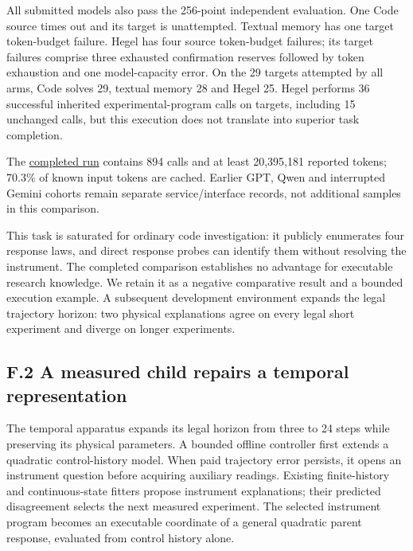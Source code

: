 \documentclass[11pt,a4paper]{article}
\begin{document}
All submitted models also pass the 256-point independent evaluation. One Code
source times out and its target is unattempted. Textual memory has one target
token-budget failure. Hegel has four source token-budget failures; its target
failures comprise three exhausted confirmation reserves followed by token
exhaustion and one model-capacity error. On the 29 targets attempted by all arms,
Code solves 29, textual memory 28 and Hegel 25. Hegel performs 36 successful
inherited experimental-program calls on targets, including 15 unchanged calls,
but this execution does not translate into superior task completion.


The \hyperlink{artifact-53}{completed run}
contains 894 calls and at least 20,395,181 reported tokens; 70.3\% of known input
tokens are cached. Earlier GPT, Qwen and interrupted Gemini cohorts remain
separate service/interface records, not additional samples in this comparison.


This task is saturated for ordinary code investigation: it publicly enumerates
four response laws, and direct response probes can identify them without
resolving the instrument. The completed comparison establishes no advantage for
executable research knowledge. We retain it as a negative comparative result
and a bounded execution example. A subsequent development environment expands the
legal trajectory horizon: two physical explanations agree on every legal short
experiment and diverge on longer experiments.


\subsection*{F.2 A measured child repairs a temporal representation}

The temporal apparatus expands its legal horizon from three to 24 steps while
preserving its physical parameters. A bounded offline controller first extends
a quadratic control-history model. When paid trajectory error persists, it
opens an instrument question before acquiring auxiliary readings. Existing
finite-history and continuous-state fitters propose instrument explanations;
their predicted disagreement selects the next measured experiment. The selected
instrument program becomes an executable coordinate of a general quadratic
parent response, evaluated from control history alone.
\end{document}
